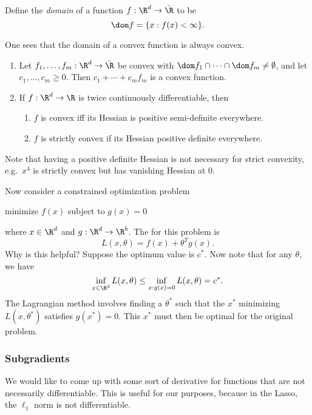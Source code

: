 \documentclass[a4paper]{article}
\begin{document}
\begin{defi}[Domain]
  Define the \emph{domain} of a function $f: \R^d \to \bar{\R}$ to be
  \[
    \dom f = \{x : f(x) < \infty\}.
  \]
\end{defi}
One sees that the domain of a convex function is always convex.

\begin{prop}\leavevmode
  \begin{enumerate}
    \item Let $f_1, \ldots, f_m: \R^d \to \bar{\R}$ be convex with $\dom f_1 \cap \cdots \cap \dom f_m \not = \emptyset$, and let $c_1, \ldots, c_m \geq 0$. Then $c_1 + \cdots + c_m f_m$ is a convex function.
    \item If $f: \R^d \to \R$ is twice continuously differentiable, then
      \begin{enumerate}
        \item $f$ is convex iff its Hessian is positive semi-definite everywhere.
        \item $f$ is strictly convex if its Hessian positive definite everywhere.
      \end{enumerate}
  \end{enumerate}
\end{prop}
Note that having a positive definite Hessian is not necessary for strict convexity, e.g.\ $x^4$ is strictly convex but has vanishing Hessian at $0$.

Now consider a constrained optimization problem
\begin{center}
  minimize $f(x)$ subject to $g(x) = 0$
\end{center}
where $x \in \R^d$ and $g: \R^d \to \R^b$. The  for this problem is
\[
  L(x, \theta) = f(x) + \theta^T g(x).
\]
Why is this helpful? Suppose the optimum value is $c^*$. Now note that for any $\theta$, we have
\[
  \inf_{x \in \R^d} L(x, \theta) \leq \inf_{x: g(x) = 0} L(x, \theta) = c^*.
\]
The Lagrangian method involves finding a $\theta^*$ such that the $x^*$ minimizing $L(x, \theta^*)$ satisfies $g(x^*) = 0$. This $x^*$ must then be optimal for the original problem. %

\subsubsection*{Subgradients}
We would like to come up with some sort of derivative for functions that are not necessarily differentiable. This is useful for our purposes, because in the Lasso, the $\ell_1$ norm is not differentiable.
\end{document}
